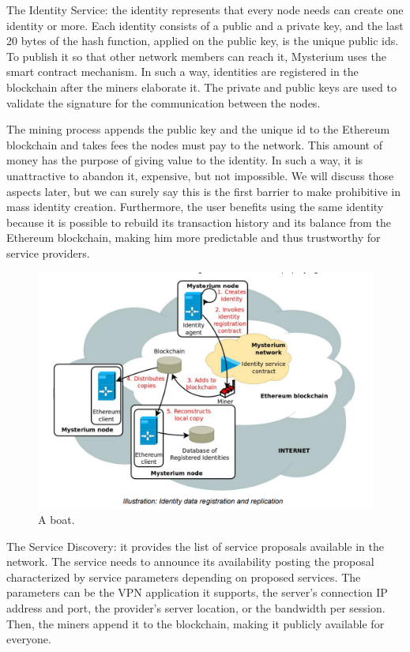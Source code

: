 \documentclass[]{article}
\begin{document}
	The Identity Service: the identity represents that every node needs can create one identity or more. Each identity consists of a public and a private key, and the last 20 bytes of the hash function, applied on the public key, is the unique public ids. To publish it so that other network members can reach it, Mysterium uses the smart contract mechanism. In such a way, identities are registered in the blockchain after the miners elaborate it. The private and public keys are used to validate the signature for the communication between the nodes. 

	The mining process appends the public key and the unique id to the Ethereum blockchain and takes fees the nodes must pay to the network. 
	This amount of money has the purpose of giving value to the identity. In such a way, it is unattractive to abandon it, expensive, but not impossible. 
	We will discuss those aspects later, but we can surely say this is the first barrier to make prohibitive in mass identity creation. 
	Furthermore, the user benefits using the same identity because it is possible to rebuild its transaction history and its balance from the Ethereum blockchain, making him more predictable and thus trustworthy for service providers. 

	\begin{figure}
		\includegraphics[width=\linewidth]{"images/mysterium_identity_creation.png"}
		\caption{A boat.}
		\label{fig:boat1}
	\end{figure}

	The Service Discovery: it provides the list of service proposals available in the network. The service needs to announce its availability posting the proposal characterized by service parameters depending on proposed services. The parameters can be the VPN application it supports, the server's connection IP address and port, the provider's server location, or the bandwidth per session. Then, the miners append it to the blockchain, making it publicly available for everyone.
\end{document}
